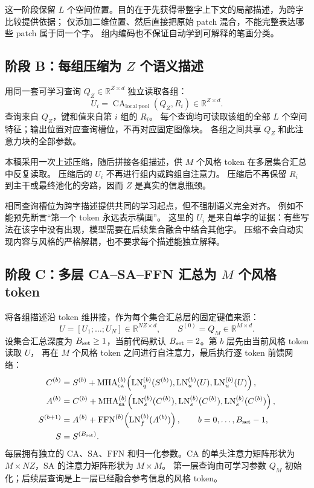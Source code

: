 \documentclass[UTF8,fontset=fandol,zihao=5,a4paper]{ctexart}
\newcommand{\R}{\mathbb R}
\newcommand{\LN}{\operatorname{LN}}
\newcommand{\CA}{\operatorname{CA}}
\newcommand{\FFN}{\operatorname{FFN}}
\newcommand{\MHA}{\operatorname{MHA}}
\begin{document}
这一阶段保留 $L$ 个空间位置。目的在于先获得带整字上下文的局部描述，为跨字比较提供依据；
仅添加二维位置、然后直接把原始 patch 混合，不能完整表达哪些 patch 属于同一个字。
组内编码也不保证自动学到可解释的笔画分类。

\subsection{阶段 B：每组压缩为 \texorpdfstring{$Z$}{Z} 个语义描述}

用同一套可学习查询 $Q_Z\in\R^{Z\times d}$ 独立读取各组：
\[
U_i=\CA_{\mathrm{local\ pool}}(Q_Z,R_i)\in\R^{Z\times d}.
\]
查询来自 $Q_Z$，键和值来自第 $i$ 组的 $R_i$。
每个查询均可读取该组的全部 $L$ 个空间特征；输出位置对应查询槽位，不再对应固定图像块。
各组之间共享 $Q_Z$ 和此注意力块的全部参数。

本稿采用一次上述压缩，随后拼接各组描述，供 $M$ 个风格 token 在多层集合汇总中反复读取。
压缩后的 $U_i$ 不再进行组内或跨组自注意力。
压缩后不再保留 $R_i$ 到主干或最终池化的旁路，因而 $Z$ 是真实的信息瓶颈。

相同查询槽位为跨字描述提供共同的学习起点，但不强制语义完全对齐。
例如不能预先断言“第一个 token 永远表示横画”。
这里的 $U_i$ 是来自单字的证据：有些写法在该字中没有出现，模型需要在后续集合融合中结合其他字。
压缩不会自动实现内容与风格的严格解耦，也不要求每个描述能独立解释。

\subsection{阶段 C：多层 CA--SA--FFN 汇总为 \texorpdfstring{$M$}{M} 个风格 token}

将各组描述沿 token 维拼接，作为每个集合汇总层的固定键值来源：
\[
U=[U_1;\ldots;U_N]\in\R^{NZ\times d},\qquad
S^{(0)}=Q_M\in\R^{M\times d}.
\]
设集合汇总深度为 $B_{\rm set}\geq1$，当前代码默认 $B_{\rm set}=2$。第 $b$ 层先由当前风格 token 读取 $U$，
再在 $M$ 个风格 token 之间进行自注意力，最后执行逐 token 前馈网络：
\begin{align*}
C^{(b)}={}&S^{(b)}+\MHA_{\rm ca}^{(b)}\!\left(
  \LN_q^{(b)}(S^{(b)}),\LN_u^{(b)}(U),\LN_u^{(b)}(U)\right),\\
A^{(b)}={}&C^{(b)}+\MHA_{\rm sa}^{(b)}\!\left(
  \LN_s^{(b)}(C^{(b)}),\LN_s^{(b)}(C^{(b)}),\LN_s^{(b)}(C^{(b)})\right),\\
S^{(b+1)}={}&A^{(b)}+\FFN^{(b)}\!\left(\LN_f^{(b)}(A^{(b)})\right),
\qquad b=0,\ldots,B_{\rm set}-1,\\
S={}&S^{(B_{\rm set})}.
\end{align*}
每层拥有独立的 CA、SA、FFN 和归一化参数。CA 的单头注意力矩阵形状为
$M\times NZ$，SA 的注意力矩阵形状为 $M\times M$。
第一层查询由可学习参数 $Q_M$ 初始化；后续层查询是上一层已经融合参考信息的风格 token。
\end{document}
